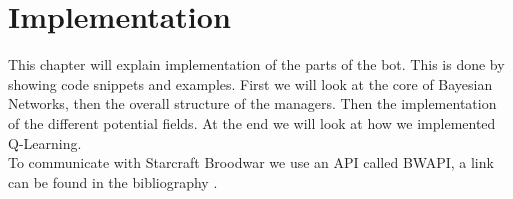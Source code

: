 \chapter{Implementation}
This chapter will explain implementation of the parts of the bot. This is done by showing code snippets and examples. First we will look at the core of Bayesian Networks, then the overall structure of the managers. Then the implementation of the different potential fields. At the end we will look at how we implemented Q-Learning.\\
To communicate with Starcraft Broodwar we use an API called BWAPI, a link can be found in the bibliography \cite{bwapi}.


	
	
	
	